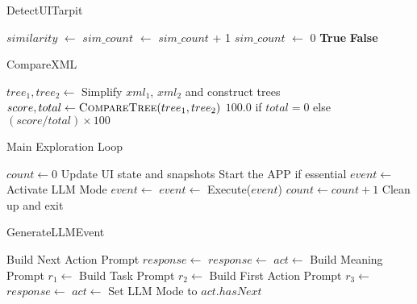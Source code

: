 \documentclass{article}
\begin{document}
\begin{algorithm}
\caption{DetectUITarpit}
\begin{algorithmic}[1]
    \State $similarity$ $\gets$ 
    \State $sim\_count$ $\gets$ $sim\_count$ + 1
        \State $sim\_count$ $\gets$ 0
        \State \Return \textbf{True}
    \EndIf
\EndIf
\State \Return \textbf{False}
\EndFunction
\end{algorithmic}
\end{algorithm}

\begin{algorithm}
\caption{CompareXML}
\begin{algorithmic}[1]
    \State $tree_1, tree_2 \gets$ Simplify $xml_1$, $xml_2$ and construct trees
    \State $score, total \gets \Call{CompareTree}{tree_1, tree_2}$
    \State \Return $100.0$ if $total = 0$ else $(score / total) \times 100$
\EndFunction
\end{algorithmic}
\end{algorithm}

\begin{algorithm}
\caption{Main Exploration Loop}
\begin{algorithmic}[1]
  \State $count \gets 0$
    \State Update UI state and snapshots
    \State Start the APP if essential
        \State $event \gets$ 
        \State Activate LLM Mode
        \State $event \gets$ 
    \Else
        \State $event \gets$ 
    \EndIf
    \State Execute($event$)
    \State $count \gets count + 1$
  \EndWhile
  \State Clean up and exit
\EndFunction
\end{algorithmic}
\end{algorithm}

\begin{algorithm}
\caption{GenerateLLMEvent}
\begin{algorithmic}[1]
          \State Build Next Action Prompt
          \State $response \gets$ 
          \State $response \gets$ 
          \State $act \gets$ 
        \Else
          \State Build Meaning Prompt
          \State $r_1 \gets$ 
          \State Build Task Prompt
          \State $r_2 \gets$ 
          \State Build First Action Prompt
          \State $r_3 \gets$ 
          \State $response \gets$ 
          \State $act \gets$ 
    \EndIf
    \State Set LLM Mode to $act.hasNext$
    \State \Return {}
\EndFunction
\end{algorithmic}
\end{algorithm}
\end{document}
